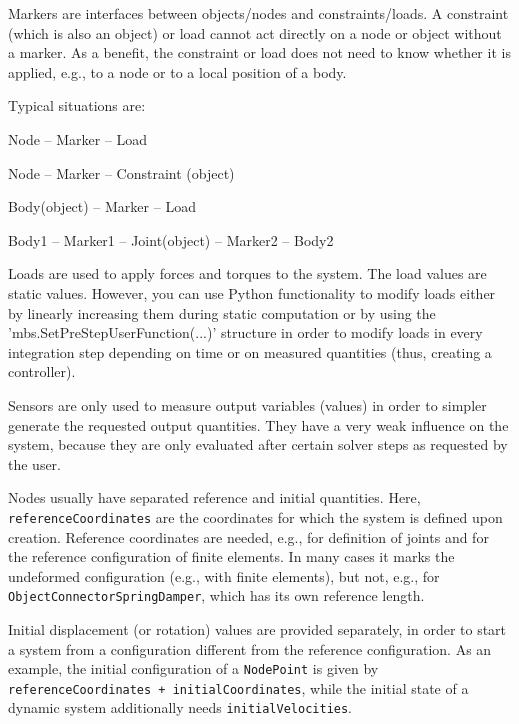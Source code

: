 Markers are interfaces between objects/nodes and constraints/loads.
A constraint (which is also an object) or load cannot act directly on a node or object without a marker.
As a benefit, the constraint or load does not need to know whether it is applied, e.g., to a node or to a local position of a body.

Typical situations are:
\bi
  \item Node -- Marker -- Load
  \item Node -- Marker -- Constraint (object)
  \item Body(object) -- Marker -- Load
  \item Body1 -- Marker1 -- Joint(object) -- Marker2 -- Body2
\ei

Loads are used to apply forces and torques to the system. The load values are static values. However, you can use Python functionality to modify loads either by linearly increasing them during static computation or by using the 'mbs.SetPreStepUserFunction(...)' structure in order to modify loads in every integration step depending on time or on measured quantities (thus, creating a controller).

Sensors are only used to measure output variables (values) in order to simpler generate the requested output quantities.
They have a very weak influence on the system, because they are only evaluated after certain solver steps as requested by the user.

Nodes usually have separated reference and initial quantities. Here, 
\texttt{referenceCoordinates} are the coordinates for which the system is defined upon creation. Reference coordinates are needed, e.g., for definition of joints and for the reference configuration of finite elements. In many cases it marks the undeformed configuration (e.g., with finite elements), but not, e.g., for \texttt{ObjectConnectorSpringDamper}, which has its own reference length. 

Initial displacement (or rotation) values are provided separately, in order to start a system from a configuration different from the reference configuration.
As an example, the initial configuration of a \texttt{NodePoint} is given by \texttt{referenceCoordinates + initialCoordinates}, while the initial state of a dynamic system additionally needs \texttt{initialVelocities}.

